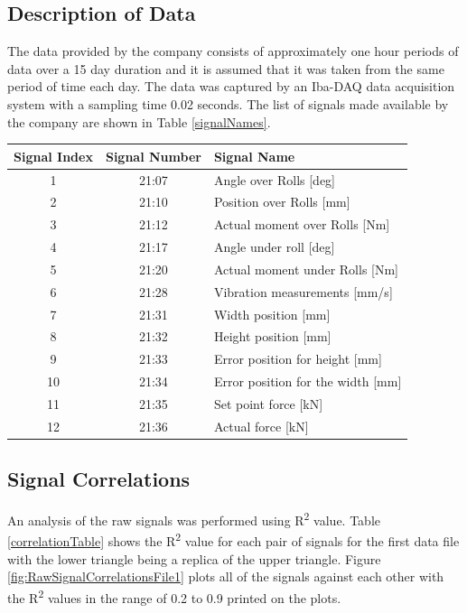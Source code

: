 \documentclass[]{article}
\begin{document}
\subsection{Description of Data}
The data provided by the company consists of approximately one hour periods of data over a 15 day duration and it is assumed that it was taken from the same period of time each day. The data was captured by an Iba-DAQ data acquisition system with a sampling time 0.02 seconds. The list of signals made available by the company are shown in Table \ref{signalNames}.
\begin{center}
\label{signalNames}
\begin{tabular}{ |c|c|l| }
 \hline
Signal Index & Signal Number & Signal Name \\ 
 \hline
1 & 21:07 & Angle over Rolls [deg] \\
 \hline
2 & 21:10 & Position over Rolls [mm] \\
 \hline
3 & 21:12 & Actual moment over Rolls [Nm] \\
 \hline
4 & 21:17 & Angle under roll [deg] \\
 \hline
5 & 21:20 & Actual moment under Rolls [Nm] \\
 \hline
6 & 21:28 & Vibration measurements [mm/s] \\ 
 \hline              
7 & 21:31 & Width position [mm] \\
 \hline
8 & 21:32 & Height position [mm] \\
 \hline
9 & 21:33 & Error position for height [mm] \\
 \hline
10 & 21:34 & Error position for the width [mm] \\
 \hline
11 & 21:35 & Set point force [kN] \\
 \hline
12 & 21:36 & Actual force [kN] \\
 \hline
\end{tabular}
\end{center}

\subsection{Signal Correlations}
An analysis of the raw signals was performed using R\textsuperscript{2} value. Table \ref{correlationTable} shows the R\textsuperscript{2} value for each pair of signals for the first data file with the lower triangle being a replica of the upper triangle. Figure \ref{fig:RawSignalCorrelationsFile1} plots all of the signals against each other with the R\textsuperscript{2} values in the range of 0.2 to 0.9 printed on the plots. 
\end{document}
